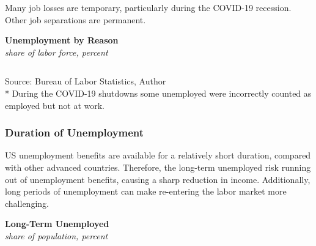 \documentclass{report}
\begin{document}
{\begin{minipage}{1.0\textwidth}
\small Many job losses are temporary, particularly during the COVID-19 recession. Other job separations are permanent. 
\vspace{1mm}

\normalsize \textbf{Unemployment by Reason}\\
\footnotesize{\textit{share of labor force, percent}}\\
 \setlength{\tabcolsep}{1.2pt} \color{black!90}
	{\renewcommand{\arraystretch}{1.5}
		\begin{tabular}{p{36mm} R{9mm} R{9mm} R{9mm} R{9mm} R{9mm} 
		   R{9mm} R{9mm} R{9mm} R{9mm}}
			  \hline
		\end{tabular}}\vspace{-1mm}
		
\footnotesize{Source: Bureau of Labor Statistics, Author}\\
\footnotesize{* During the COVID-19 shutdowns some unemployed were incorrectly counted as employed but not at work.}
\end{minipage}
\newpage
\begin{minipage}{1.0\textwidth} 
\subsubsection*{Duration of Unemployment}
\small US unemployment benefits are available for a relatively short duration, compared with other advanced countries. Therefore, the long-term unemployed risk running out of unemployment benefits, causing a sharp reduction in income. Additionally, long periods of unemployment can make re-entering the labor market more challenging. 


\vspace{1mm}

\normalsize \textbf{Long-Term Unemployed}\\
\footnotesize{\textit{share of population, percent}}
\vspace{3.2cm}


\end{minipage}}
\end{document}
